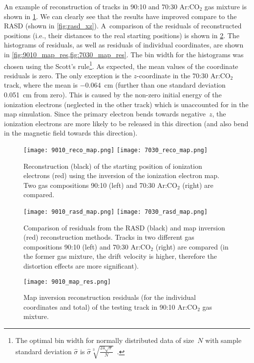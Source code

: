 			An example of reconstruction of tracks in 90:10 and 70:30 Ar:CO$_2$ gas mixture is shown in \cref{fig:reco_map}. We can clearly see that the results have improved compare to the \acf{RASD} (shown in \cref{fig:rasd_xz}). A~comparison of the residuals of reconstructed positions (i.e., their distances to the real starting positions) is shown in \cref{fig:rasd_map}. The histograms of residuals, as well as residuals of individual coordinates, are shown in \cref{fig:9010_map_res,fig:7030_map_res}. The bin width for the histograms was chosen using the Scott's rule\footnote{The optimal bin width for normally distributed data of size~$N$ with sample standard deviation $\hat{\sigma}$ is $\hat{\sigma}\sqrt[3]{\frac{24\sqrt{\pi}}{N}}$~\cite{scott}.}. As expected, the mean values of the coordinate residuals is zero. The only exception is the $z$\nobreakdash-coordinate in the 70:30 Ar:CO$_2$ track, where the mean is \qty{-0.064}{\cm} (further than one standard deviation \qty{0.051}{\cm} from zero). This is caused by the non-zero initial energy of the ionization electrons (neglected in the other track) which is unaccounted for in the map simulation. Since the primary electron bends towards negative~$z$, the ionization electrons are more likely to be released in this direction (and also bend in the magnetic field towards this direction).
			
			\begin{figure}
				\centering
				\texttt{[image: 9010\_reco\_map.png]}
				\hfill
				\texttt{[image: 7030\_reco\_map.png]}
				\caption{Reconstruction (black) of the starting position of ionization electrons (red) using the inversion of the ionization electron map. Two gas compositions 90:10 (left) and 70:30 Ar:CO$_2$ (right) are compared.}
				\label{fig:reco_map}
			\end{figure}
			
			\begin{figure}
				\centering
				\texttt{[image: 9010\_rasd\_map.png]}
				\hfill
				\texttt{[image: 7030\_rasd\_map.png]}
				\caption{Comparison of residuals from the \ac{RASD} (black) and map inversion (red) reconstruction methods. Tracks in two different gas compositions 90:10 (left) and 70:30 Ar:CO$_2$ (right) are compared (in the former gas mixture, the drift velocity is higher, therefore the distortion effects are more significant).}
				\label{fig:rasd_map}
			\end{figure}
			
			\begin{figure}
				\centering
				\texttt{[image: 9010\_map\_res.png]}
				\caption{Map inversion reconstruction residuals (for the individual coordinates and total) of the testing track in 90:10 Ar:CO$_2$ gas mixture.}
				\label{fig:9010_map_res}
			\end{figure}
			

